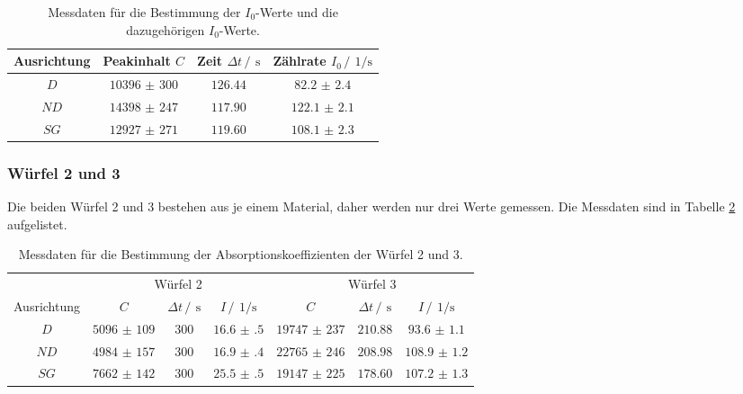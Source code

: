 \FloatBarrier
\begin{table}
    \centering
    \caption{Messdaten für die Bestimmung der $I_0$-Werte und die dazugehörigen $I_0$-Werte.}
    \label{tab:I_0}
    \begin{tabular}{c c c c}
        \toprule
        Ausrichtung&Peakinhalt $C$&Zeit $\Delta t \,/\,\SI{}{\second}$&Zählrate $I_0 \,/\,\SI{}{1\per\second}$\\
        \midrule
        $D$ &$\num{10396(300)}$&$\num{126.44}$&$\num{82.2(24)}$\\
        $ND$&$\num{14398(247)}$&$\num{117.90}$&$\num{122.1(21)}$\\
        $SG$&$\num{12927(271)}$&$\num{119.60}$&$\num{108.1(23)}$\\
        \bottomrule
    \end{tabular}
\end{table}
\FloatBarrier

\subsubsection{Würfel 2 und 3}

Die beiden Würfel 2 und 3 bestehen aus je einem Material, daher werden nur drei Werte gemessen.
Die Messdaten sind in Tabelle \ref{tab:Würfel_1_2} aufgelistet.

\FloatBarrier
\begin{table}
    \centering
    \caption{Messdaten für die Bestimmung der Absorptionskoeffizienten der Würfel 2 und 3.}
    \label{tab:Würfel_1_2}
    \begin{tabular}{c c c c c c c}
        \toprule
        &\multicolumn{3}{c}{Würfel 2}&\multicolumn{3}{c}{Würfel 3}\\
        \cmidrule(lr){2-4}\cmidrule(lr){5-7}
        Ausrichtung&$C$&$\Delta t \,/\,\SI{}{\second}$&$I \,/\,\SI{}{1\per\second}$&$C$&$\Delta t \,/\,\SI{}{\second}$&$I \,/\,\SI{}{1\per\second}$\\
        \midrule
        $D$ &$\num{5096(109)}$&$\num{300}$&$\num{16.6(5)}$&$\num{19747(237)}$&$\num{210.88}$&$\num{93.6(11)}$\\
        $ND$&$\num{4984(157)}$&$\num{300}$&$\num{16.9(4)}$&$\num{22765(246)}$&$\num{208.98}$&$\num{108.9(12)}$\\
        $SG$&$\num{7662(142)}$&$\num{300}$&$\num{25.5(5)}$&$\num{19147(225)}$&$\num{178.60}$&$\num{107.2(13)}$\\
        \bottomrule
    \end{tabular}
\end{table}
\FloatBarrier


